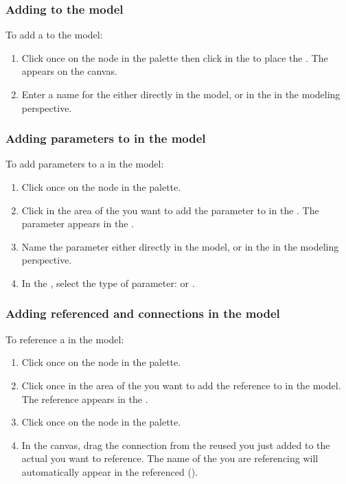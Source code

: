 \subsubsection{Adding \gdcases{} to the model}
To add a \gdcase{} to the model:
\begin{enumerate}
\item Click once on the \gdcase{} node in the palette then click in the \gdmodeleditor{} to place the \gdcase{}. The \gdcase{} appears on the canvas. 
\item Enter a name for the \gdcase{} either directly in the model, or in the \gdpropview{} in the modeling perspective. 
\end{enumerate}

\subsubsection{Adding parameters to \gdcases{} in the model}
To add parameters to a \gdcase{} in the model:
\begin{enumerate}
\item Click once on the  node in the palette.
\item Click in the  area of the \gdcase{} you want to add the parameter to in the \gdmodeleditor{}.  The parameter appears in the \gdcase{}. 
\item Name the parameter either directly in the model, or in the \gdpropview{} in the modeling perspective. 
\item In the \gdpropview{}, select the type of parameter:  or .
\end{enumerate}

\subsubsection{Adding referenced \gdcases{} and connections in the model}
To reference a \gdcase{} in the model:
\begin{enumerate}
\item Click once on the  node in the palette.
\item Click once in the  area of the \gdcase{} you want to add the \gdcase{} reference to in the model. The \gdcase{} reference appears in the \gdcase{}. 
\item Click once on the  node in the palette. 
\item In the canvas, drag the connection from the reused \gdcase{} you just added to the actual \gdcase{} you want to reference. The name of the \gdcase{} you are referencing will automatically appear in the referenced \gdcase{} (). 
\end{enumerate}

